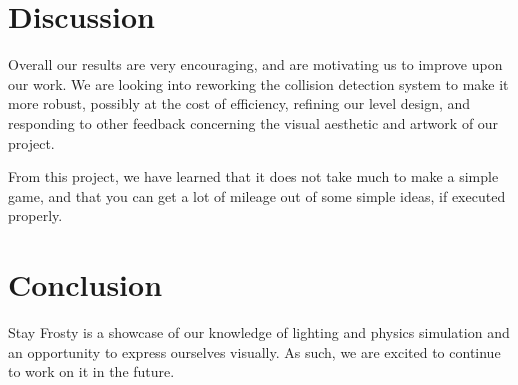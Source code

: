 \documentclass[11pt]{article} %
\begin{document}
\section{Discussion}

Overall our results are very encouraging, and are motivating us to improve upon our work.  We are looking into reworking the collision detection system to make it more robust, possibly at the cost of efficiency, refining our level design, and responding to other feedback concerning the visual aesthetic and artwork of our project.
\par From this project, we have learned that it does not take much to make a simple game, and that you can get a lot of mileage out of some simple ideas, if executed properly.

\section{Conclusion}

Stay Frosty is a showcase of our knowledge of lighting and physics simulation and an opportunity to express ourselves visually. As such, we are excited to continue to work on it in the future.
\end{document}
